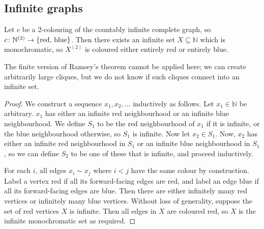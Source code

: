 \subsection{Infinite graphs}
\begin{theorem}
	Let \( c \) be a 2-colouring of the countably infinite complete graph, so \( c \colon \mathbb N^{(2)} \to \qty{\text{red, blue}} \).
	Then there exists an infinite set \( X \subseteq \mathbb N \) which is monochromatic, so \( X^{(2)} \) is coloured either entirely red or entirely blue.
\end{theorem}
\begin{remark}
	The finite version of Ramsey's theorem cannot be applied here; we can create arbitrarily large cliques, but we do not know if such cliques connect into an infinite set.
\end{remark}
\begin{proof}
	We construct a sequence \( x_1, x_2, \dots \) inductively as follows.
	Let \( x_1 \in \mathbb N \) be arbitrary.
	\( x_1 \) has either an infinite red neighbourhood or an infinite blue neighbourhood.
	We define \( S_1 \) to be the red neighbourhood of \( x_1 \) if it is infinite, or the blue neighbourhood otherwise, so \( S_1 \) is infinite.
	Now let \( x_2 \in S_1 \).
	Now, \( x_2 \) has either an infinite red neighbourhood in \( S_1 \) or an infinite blue neighbourhood in \( S_1 \), so we can define \( S_2 \) to be one of these that is infinite, and proceed inductively.

	For each \( i \), all edges \( x_i \sim x_j \) where \( i < j \) have the same colour by construction.
	Label a vertex red if all its forward-facing edges are red, and label an edge blue if all its forward-facing edges are blue.
	Then there are either infinitely many red vertices or infinitely many blue vertices.
	Without loss of generality, suppose the set of red vertices \( X \) is infinite.
	Then all edges in \( X \) are coloured red, so \( X \) is the infinite monochromatic set as required.
\end{proof}
